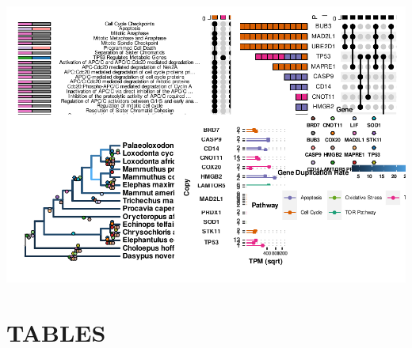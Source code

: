 \documentclass[]{elsarticle} %
\let\origfigure\figure
\let\endorigfigure\endfigure
\renewenvironment{figure}[1][2] {
    \expandafter\origfigure\expandafter[H]
} {
    \endorigfigure
}
\begin{document}
\begin{figure}[H]
\includegraphics[width=6in,]{paper_PLOS_draft_files/figure-latex/Figure-LoxAfrExpressedDups-1} \caption{Duplications that occured in the African Savannah Elephant, \emph{Loxodonta africana}, are enriched for TP53-related and other tumor suppressor processes. \textbf{A)} Upset plot of cancer-related Reactome pathways in \emph{Loxodonta africana}, highlighting shared genes in each set, and the pathway class represented by the combinations. \textbf{B)} Inverted Upset plot from \textbf{A)}, showing the pathways shared by genes highlighted by WEBGESTALT in each pathway. \textbf{C)} Cladogram of \emph{Atlantogenata}, colored by the rate of gene duplication estimated by maximum likelihood. Dots represent a duplication event of the color-coded genes. \textbf{D)} Gene expression levels of genes in \textbf{C)} which have two or more expressed duplicates.}\label{fig:Figure-LoxAfrExpressedDups}
\end{figure}

\hypertarget{tables}{%
\section{TABLES}\label{tables}}
\end{document}
